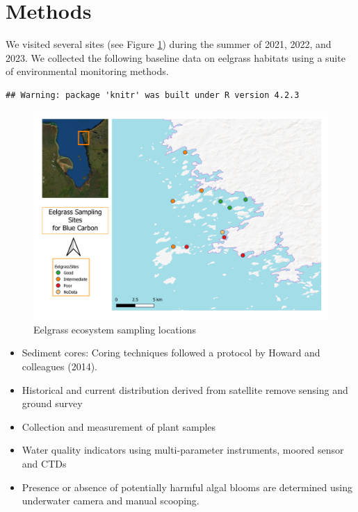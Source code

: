 \documentclass[
  12pt,
]{article}
\providecommand{\tightlist}{%
  \setlength{\itemsep}{0pt}\setlength{\parskip}{0pt}}
\begin{document}
\hypertarget{methods}{%
\section{Methods}\label{methods}}

We visited several sites (see Figure \ref{fig:sites}) during the summer
of 2021, 2022, and 2023. We collected the following baseline data on
eelgrass habitats using a suite of environmental monitoring methods.

\begin{verbatim}
## Warning: package 'knitr' was built under R version 4.2.3
\end{verbatim}

\begin{figure}

{\centering \includegraphics[width=1\linewidth]{BlueCarbonSites} 

}

\caption{Eelgrass ecosystem sampling locations}\label{fig:sites}
\end{figure}

\begin{itemize}
\tightlist
\item
  Sediment cores: Coring techniques followed a protocol by Howard and
  colleagues (2014).
\item
  Historical and current distribution derived from satellite remove
  sensing and ground survey
\item
  Collection and measurement of plant samples
\item
  Water quality indicators using multi-parameter instruments, moored
  sensor and CTDs
\item
  Presence or absence of potentially harmful algal blooms are determined
  using underwater camera and manual scooping.
\end{itemize}
\end{document}
